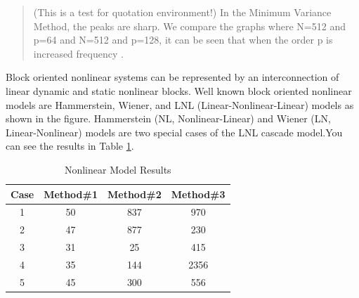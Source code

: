 \documentclass{iitthesis}
\begin{document}
\begin{quotation}
(This is a test for quotation environment!) In the Minimum
Variance Method, the peaks are sharp. We compare the graphs where
N=512 and p=64 and N=512 and p=128, it can be seen that when the
order p is increased frequency \cite{Boney96}.
\end{quotation}

 Block oriented
nonlinear systems can be represented by an interconnection of
linear dynamic and static nonlinear blocks. Well known block
oriented nonlinear models are Hammerstein, Wiener, and LNL
(Linear-Nonlinear-Linear) models as shown in the figure.
Hammerstein (NL, Nonlinear-Linear) and Wiener (LN,
Linear-Nonlinear) models are two special cases of the LNL cascade
model.You can see the results in Table \ref{table:nonlin}.


\begin{table}[ht]
\caption{Nonlinear Model Results}   %
\centering                          %
\begin{tabular}{c c c c}            %
\hline\hline                        %
Case & Method\#1 & Method\#2 & Method\#3 \\ [0.5ex] %
\hline                              %
1 & 50 & 837 & 970  \\              %
2 & 47 & 877 & 230  \\
3 & 31 & 25  & 415  \\
4 & 35 & 144 & 2356 \\
5 & 45 & 300 & 556 \\ [1ex]         %
\hline                              %
\end{tabular}
\label{table:nonlin}                %
\end{table}
\end{document}
